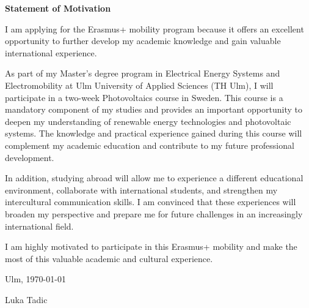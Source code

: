 \documentclass[11pt,a4paper]{article}
\begin{document}
\begin{center}
    {\Large \textbf{Statement of Motivation}}
\end{center}

\vspace{0.5cm}

I am applying for the Erasmus+ mobility program because it offers an excellent opportunity to further develop my academic knowledge and gain valuable international experience.

As part of my Master's degree program in Electrical Energy Systems and Electromobility at Ulm University of Applied Sciences (TH Ulm), I will participate in a two-week Photovoltaics course in Sweden. This course is a mandatory component of my studies and provides an important opportunity to deepen my understanding of renewable energy technologies and photovoltaic systems. The knowledge and practical experience gained during this course will complement my academic education and contribute to my future professional development.

In addition, studying abroad will allow me to experience a different educational environment, collaborate with international students, and strengthen my intercultural communication skills. I am convinced that these experiences will broaden my perspective and prepare me for future challenges in an increasingly international field.

I am highly motivated to participate in this Erasmus+ mobility and make the most of this valuable academic and cultural experience.

\vspace{1cm}

Ulm, \today

\vspace{0.8cm}

Luka Tadic
\end{document}
